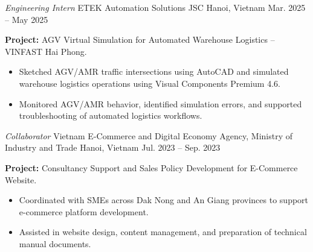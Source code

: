 
\begin{cventries}
  \cventry
    {\textit{Engineering Intern}}
    {ETEK Automation Solutions JSC}
    {Hanoi, Vietnam}
    {Mar. 2025 -- May 2025}
    {
      \begin{cvitems}
        \item {\textbf{Project:} AGV Virtual Simulation for Automated Warehouse Logistics -- VINFAST Hai Phong.}
        \begin{itemize}
          \item {Sketched AGV/AMR traffic intersections using AutoCAD and simulated warehouse logistics operations using Visual Components Premium 4.6.}
          \item {Monitored AGV/AMR behavior, identified simulation errors, and supported troubleshooting of automated logistics workflows.}
        \end{itemize}
      \end{cvitems}
    }

  \cventry
    {\textit{Collaborator}}
    {Vietnam E-Commerce and Digital Economy Agency, Ministry of Industry and Trade}
    {Hanoi, Vietnam}
    {Jul. 2023 -- Sep. 2023}
    {
      \begin{cvitems}
        \item {\textbf{Project:} Consultancy Support and Sales Policy Development for E-Commerce Website.}
        \begin{itemize}[leftmargin=1.8em, itemsep=0pt, topsep=0.1em, parsep=0pt]
          \item{Coordinated with SMEs across Dak Nong and An Giang provinces to support e-commerce platform development.}
          \item{Assisted in website design, content management, and preparation of technical manual documents.}
        \end{itemize}
      \end{cvitems}
    }
    
\end{cventries}
